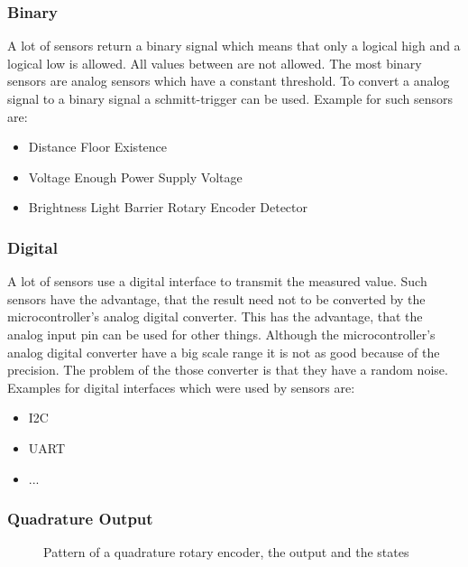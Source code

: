 \subsubsection{Binary}
A lot of sensors return a binary signal which means that only a logical high and a logical low is allowed.
All values between are not allowed.
The most binary sensors are analog sensors which have a constant threshold.
To convert a analog signal to a binary signal a schmitt-trigger can be used.
Example for such sensors are:
\begin{itemize}
\item Distance
\subitem Floor Existence
\item Voltage
\subitem Enough Power Supply Voltage
\item Brightness
\subitem Light Barrier
\subsubitem Rotary Encoder Detector 
\end{itemize}


\subsubsection{Digital}
A lot of sensors use a digital interface to transmit the measured value.
Such sensors have the advantage, that the result need not to be converted by the microcontroller's analog digital converter.
This has the advantage, that the analog input pin can be used for other things.
Although the microcontroller's analog digital converter have a big scale range it is not as good because of the precision.
The problem of the those converter is that they have a random noise.
Examples for digital interfaces which were used by sensors are:
\begin{itemize}
\item I2C
\item UART
\item ...
\end{itemize}


\subsubsection{Quadrature Output}


\begin{figure}
\makebox[\linewidth]{



}
\caption{Pattern of a quadrature rotary encoder, the output and the states}
\label{fig:quadratureRotaryEncoder}
\end{figure}

